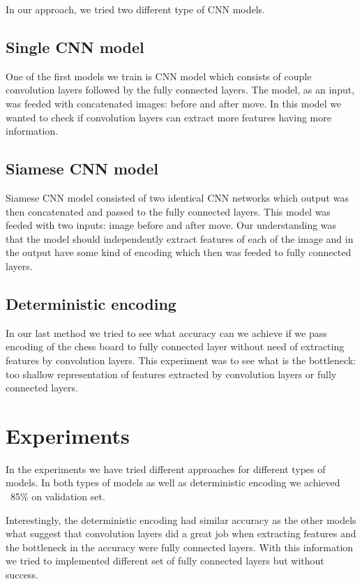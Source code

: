 \documentclass[10pt,twocolumn,letterpaper]{article}
\begin{document}
In our approach, we tried two different type of CNN models.

\subsection{Single CNN model}

One of the first models we train is CNN model which consists of couple convolution
layers followed by the fully connected layers. The model, as an input, was feeded
with concatenated images: before and after move. In this model we wanted to check
if convolution layers can extract more features having more information.

\subsection{Siamese CNN model}

Siamese CNN model consisted of two identical CNN networks which output was then
concatenated and passed to the fully connected layers. This model was feeded
with two inputs: image before and after move. Our understanding was that the
model should independently extract features of each of the image and in the
output have some kind of encoding which then was feeded to fully connected
layers.

\subsection{Deterministic encoding}

In our last method we tried to see what accuracy can we achieve if we pass
encoding of the chess board to fully connected layer without need of extracting
features by convolution layers. This experiment was to see what is the bottleneck:
too shallow representation of features extracted by convolution layers or fully
connected layers.

\section{Experiments}

In the experiments we have tried different approaches for different types of
models. In both types of models as well as deterministic encoding we achieved
~85\% on validation set.

Interestingly, the deterministic encoding had similar accuracy as the other models
what suggest that convolution layers did a great job when extracting features
and the bottleneck in the accuracy were fully connected layers. With this information
we tried to implemented different set of fully connected layers but without
success.
\end{document}
